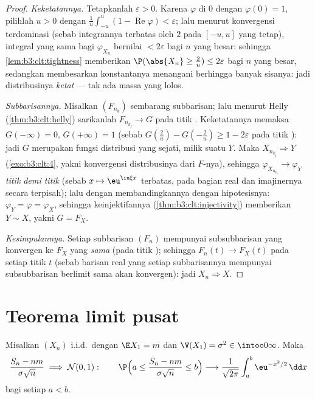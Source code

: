 \begin{proof}
\emph{Keketatannya.} Tetapkanlah $\varepsilon > 0$. Karena $\varphi$
 di $0$ dengan $\varphi(0) = 1$, pilihlah $u > 0$ dengan
$\frac1u\int_{-u}^u(1 - \operatorname{Re}\varphi) <
\varepsilon$; lalu menurut konvergensi terdominasi (sebab integrannya terbatas oleh
$2$ pada $[-u,u]$ yang tetap), integral yang sama bagi
$\varphi_{X_n}$ bernilai $< 2\varepsilon$ bagi $n$ yang besar:
sehingga \cref{lem:b3:clt:tightness} memberikan $\P(\abs{X_n} \geq \frac2u)
\leq 2\varepsilon$ bagi $n$ yang besar, sedangkan membesarkan konstantanya
menangani berhingga banyak sisanya: jadi distribusinya \emph{ketat}
--- tak ada massa yang lolos.

\emph{Subbarisannya.} Misalkan $(F_{n_k})$ sembarang subbarisan; lalu menurut
Helly (\cref{thm:b3:clt:helly}) sarikanlah $F_{n_{k_j}} \to G$
pada titik . Keketatannya memaksa $G(-\infty) = 0$,
$G(+\infty) = 1$ (sebab $G(\frac2u) - G(-\frac2u) \geq 1 -
2\varepsilon$ pada titik ): jadi $G$ merupakan fungsi
distribusi yang sejati, milik suatu  $Y$. Maka
$X_{n_{k_j}} \Rightarrow Y$ (\cref{exo:b3:clt:4},
yakni konvergensi distribusinya dari $F$-nya), sehingga
$\varphi_{X_{n_{k_j}}} \to \varphi_Y$ \emph{titik demi titik} (sebab $x
\mapsto \eu^{\iu\xi x}$  terbatas, pada bagian real dan
imajinernya secara terpisah); lalu dengan membandingkannya dengan hipotesisnya:
$\varphi_Y = \varphi = \varphi_X$, sehingga keinjektifannya
(\cref{thm:b3:clt:injectivity}) memberikan $Y \sim X$, yakni $G =
F_X$.

\emph{Kesimpulannya.} Setiap subbarisan $(F_n)$ mempunyai
subsubbarisan yang konvergen ke $F_X$ yang \emph{sama} (pada titik
); sehingga $F_n(t) \to F_X(t)$ pada setiap
titik  $t$ (sebab barisan real yang setiap
subbarisannya mempunyai subsubbarisan berlimit sama akan
konvergen): jadi $X_n \Rightarrow X$.
\end{proof}

\section{Teorema limit pusat}

\begin{theorem}\label{thm:b3:clt:clt}
Misalkan $(X_n)$ i.i.d.\ dengan $\E X_1 = m$ dan $\V(X_1) =
\sigma^2 \in \intoo0\infty$. Maka
\[
\frac{S_n - nm}{\sigma\sqrt n} \;\Longrightarrow\; \mathcal
N(0, 1) :
\qquad
\P\Bigl(a \leq \frac{S_n - nm}{\sigma\sqrt n} \leq
b\Bigr) \longrightarrow
\frac{1}{\sqrt{2\pi}}\int_a^b\eu^{-x^2/2}\,\dd x
\]
bagi setiap $a < b$.
\end{theorem}


